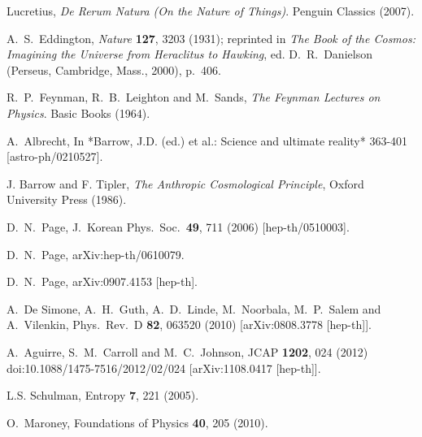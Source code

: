 \documentclass[12pt,letterpaper]{article}
\begin{document}
\begin{thebibliography}{999}
Lucretius, \emph{De Rerum Natura (On the Nature of Things)}. Penguin Classics (2007).

A.~S.~Eddington, {\it Nature} {\bf 127}, 3203 (1931);
reprinted in {\it The Book of the Cosmos: Imagining the Universe from
Heraclitus to Hawking}, ed. D.~R.~Danielson (Perseus,
Cambridge, Mass., 2000), p.\ 406.

  R.~P.~Feynman, R.~B.~Leighton and M.~Sands,
  \emph{The Feynman Lectures on Physics}.
  Basic Books (1964).

  A.~Albrecht,
  In *Barrow, J.D. (ed.) et al.: Science and ultimate reality* 363-401
  [astro-ph/0210527].

J. Barrow and F. Tipler, \emph{The Anthropic Cosmological Principle}, Oxford University Press (1986).

  D.~N.~Page,
  J.\ Korean Phys.\ Soc.\  {\bf 49}, 711 (2006)
  [hep-th/0510003].
  
  D.~N.~Page,
  arXiv:hep-th/0610079.

  D.~N.~Page,
  arXiv:0907.4153 [hep-th].
  
  A.~De Simone, A.~H.~Guth, A.~D.~Linde, M.~Noorbala, M.~P.~Salem and A.~Vilenkin,
  Phys.\ Rev.\ D {\bf 82}, 063520 (2010)
  [arXiv:0808.3778 [hep-th]].

  A.~Aguirre, S.~M.~Carroll and M.~C.~Johnson,
  JCAP {\bf 1202}, 024 (2012)
  doi:10.1088/1475-7516/2012/02/024
  [arXiv:1108.0417 [hep-th]].

 L.S. Schulman, Entropy {\bf 7}, 221 (2005).

 O.\ Maroney, Foundations of Physics {\bf 40}, 205 (2010).


\end{thebibliography}
\end{document}
